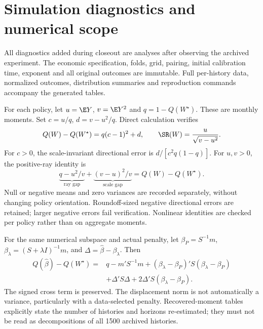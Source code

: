 \section{Simulation diagnostics and numerical scope}
\label{app:simulations}
All diagnostics added during closeout are analyses after observing the archived experiment. The economic specification, folds, grid, pairing, initial calibration time, exponent and all original outcomes are immutable. Full per-history data, normalized outcomes, distribution summaries and reproduction commands accompany the generated tables.

\begin{table}[htbp]\centering\small
\caption{Initial-CV descriptive baseline slopes on the established windows. The slope is the regression of log Monte Carlo mean, not the mean of per-history slopes. Full covariance preserves complete history dependence across horizons.}

\end{table}
\begin{table}[htbp]\centering\small
\caption{Initial-CV endpoints in the five economies, all 300 histories. The common comparison grid ends at $T=3240$; baseline continues to 4860.}

\end{table}

For each policy, let $u=\E Y$, $v=\E Y^2$ and $q=1-Q(W^\star)$. These are monthly moments. Set $c=u/q$, $d=v-u^2/q$. Direct calculation verifies
\[
Q(W)-Q(W^\star)=q(c-1)^2+d,\qquad
\SR(W)=\frac{u}{\sqrt{v-u^2}}.
\]
For $c>0$, the scale-invariant directional error is $d/[c^2q(1-q)]$. For $u,v>0$, the positive-ray identity is
\[
\underbrace{q-u^2/v}_{\text{ray gap}}+
\underbrace{(v-u)^2/v}_{\text{scale gap}}=Q(W)-Q(W^\star).
\]
Null or negative means and zero variances are recorded separately, without changing policy orientation. Roundoff-sized negative directional errors are retained; larger negative errors fail verification. Nonlinear identities are checked per policy rather than on aggregate moments.

For the same numerical subspace and actual penalty, let $\beta_P=S^{-1}m$, $\beta_\lambda=(S+\lambda I)^{-1}m$, and $\Delta=\widehat\beta-\beta_\lambda$. Then
\begin{align*}
Q(\widehat\beta)-Q(W^\star)
={}&q-m'S^{-1}m
+(\beta_\lambda-\beta_P)'S(\beta_\lambda-\beta_P)\\
&+\Delta'S\Delta+2\Delta'S(\beta_\lambda-\beta_P).
\end{align*}
The signed cross term is preserved. The displacement norm is not automatically a variance, particularly with a data-selected penalty. Recovered-moment tables explicitly state the number of histories and horizons re-estimated; they must not be read as decompositions of all 1500 archived histories.

